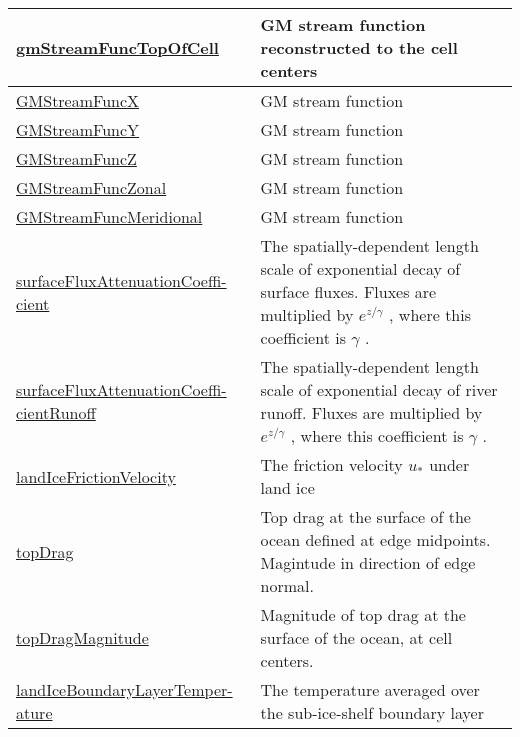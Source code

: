 {\begin{center}
\begin{longtable}{| p{2.0in} | p{4.0in} |}
    \hline
    \hyperref[subsec:var_sec_diagnostics_gmStreamFuncTopOfCell]{gmStreamFuncTopOfCell} & GM stream function reconstructed to the cell centers \\
    \hline
    \hyperref[subsec:var_sec_diagnostics_GMStreamFuncX]{GMStreamFuncX} & GM stream function \\
    \hline
    \hyperref[subsec:var_sec_diagnostics_GMStreamFuncY]{GMStreamFuncY} & GM stream function \\
    \hline
    \hyperref[subsec:var_sec_diagnostics_GMStreamFuncZ]{GMStreamFuncZ} & GM stream function \\
    \hline
    \hyperref[subsec:var_sec_diagnostics_GMStreamFuncZonal]{GMStreamFuncZonal} & GM stream function \\
    \hline
    \hyperref[subsec:var_sec_diagnostics_GMStreamFuncMeridional]{GMStreamFuncMeridional} & GM stream function \\
    \hline
    \hyperref[subsec:var_sec_diagnostics_surfaceFluxAttenuationCoefficient]{surfaceFluxAttenuationCoeffi-}\hyperref[subsec:var_sec_diagnostics_surfaceFluxAttenuationCoefficient]{cient  }&  The spatially-dependent length scale of exponential decay of surface fluxes. Fluxes are multiplied by  $e^{z/\gamma}$ , where this coefficient is  $\gamma$ . \\
    \hline
    \hyperref[subsec:var_sec_diagnostics_surfaceFluxAttenuationCoefficientRunoff]{surfaceFluxAttenuationCoeffi-}\hyperref[subsec:var_sec_diagnostics_surfaceFluxAttenuationCoefficientRunoff]{cientRunoff  }&  The spatially-dependent length scale of exponential decay of river runoff. Fluxes are multiplied by  $e^{z/\gamma}$ , where this coefficient is  $\gamma$ . \\
    \hline
    \hyperref[subsec:var_sec_diagnostics_landIceFrictionVelocity]{landIceFrictionVelocity} &  The friction velocity  $u_*$  under land ice \\
    \hline
    \hyperref[subsec:var_sec_diagnostics_topDrag]{topDrag} & Top drag at the surface of the ocean defined at edge midpoints. Magintude in direction of edge normal. \\
    \hline
    \hyperref[subsec:var_sec_diagnostics_topDragMagnitude]{topDragMagnitude} & Magnitude of top drag at the surface of the ocean, at cell centers. \\
    \hline
    \hyperref[subsec:var_sec_diagnostics_landIceBoundaryLayerTemperature]{landIceBoundaryLayerTemper-}\hyperref[subsec:var_sec_diagnostics_landIceBoundaryLayerTemperature]{ature}  & The temperature averaged over the sub-ice-shelf boundary layer \\

\end{longtable}
\end{center}}

